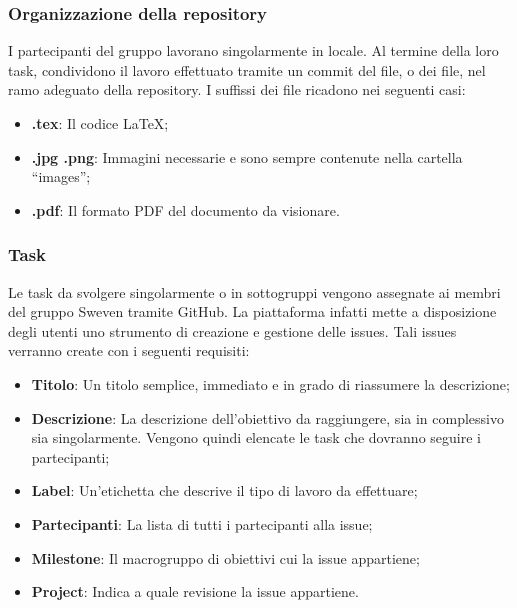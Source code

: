 \subsubsection{Organizzazione della repository}
I partecipanti del gruppo lavorano singolarmente in locale. Al termine della loro task, condividono 
il lavoro effettuato tramite un commit del file, o dei file, nel ramo adeguato della repository.
I suffissi dei file ricadono nei seguenti casi:
\begin{itemize}
    \item \textbf{.tex}: Il codice \LaTeX;
    \item \textbf{.jpg .png}: Immagini necessarie e sono sempre contenute nella cartella ``images'';
    \item \textbf{.pdf}: Il formato PDF del documento da visionare.
\end{itemize}
\subsubsection{Task}
Le task da svolgere singolarmente o in sottogruppi vengono assegnate ai membri del gruppo Sweven tramite
GitHub. La piattaforma infatti mette a disposizione degli utenti uno strumento di creazione e gestione delle 
issues. Tali issues verranno create con i seguenti requisiti:
\begin{itemize}
    \item \textbf{Titolo}: Un titolo semplice, immediato e in grado di riassumere la descrizione;
    \item \textbf{Descrizione}: La descrizione dell'obiettivo da raggiungere, sia in complessivo sia singolarmente. 
                                Vengono quindi elencate le task che dovranno seguire i partecipanti;
    \item \textbf{Label}: Un'etichetta che descrive il tipo di lavoro da effettuare;
    \item \textbf{Partecipanti}: La lista di tutti i partecipanti alla issue;
    \item \textbf{Milestone}: Il macrogruppo di obiettivi cui la issue appartiene;
    \item \textbf{Project}: Indica a quale revisione la issue appartiene.
\end{itemize}